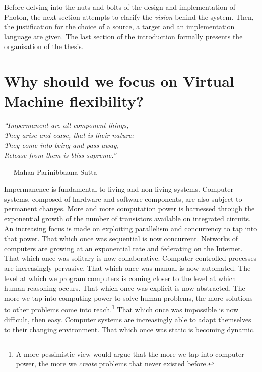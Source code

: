 
Before delving into the nuts and bolts of the design and implementation of
Photon, the next section attempts to clarify the \textit{vision} behind the
system. Then, the justification for the choice of a source, a target and an
implementation language are given. The last section of the introduction
formally presents the organisation of the thesis. 

\newpage
\section{Why should we focus on Virtual Machine flexibility?}

\emph{``Impermanent are all component things,\\
They arise and cease, that is their nature:\\
They come into being and pass away,\\
Release from them is bliss supreme.''} 

--- Mahaa-Parinibbaana Sutta \cite{1988last}

Impermanence is fundamental to living and non-living systems. Computer systems,
composed of hardware and software components, are also subject to permanent
changes. More and more computation power is harnessed through the exponential
growth of the number of transistors available on integrated circuits. An
increasing focus is made on exploiting parallelism and concurrency to tap into
that power. That which once was sequential is now concurrent. Networks of
computers are growing at an exponential rate and federating on the Internet.
That which once was solitary is now collaborative.  Computer-controlled
processes are increasingly pervasive. That which once was manual is now
automated. The level at which we program computers is coming closer to the
level at which human reasoning occurs. That which once was explicit is now
abstracted.  The more we tap into computing power to solve human problems, the
more solutions to other problems come into reach.\footnote{A more pessimistic
view would argue that the more we tap into computer power, the more we
\textit{create} problems that never existed before.} That which once was
impossible is now difficult, then easy. Computer systems are increasingly able
to adapt themselves to their changing environment. That which once was static
is becoming dynamic.


